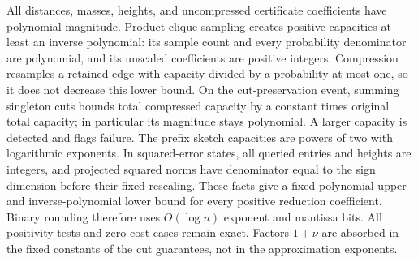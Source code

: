 \documentclass[11pt]{article}
\theoremstyle{definition}
\begin{document}
All distances, masses, heights, and uncompressed certificate coefficients
have polynomial magnitude. Product-clique sampling creates positive
capacities at least an inverse polynomial: its sample count and every
probability denominator are polynomial, and its unscaled coefficients
are positive integers. Compression resamples a retained edge with
capacity divided by a probability at most one, so it does not decrease
this lower bound. On the cut-preservation event, summing singleton cuts
bounds total compressed capacity by a constant times original total
capacity; in particular its magnitude stays polynomial. A larger
capacity is detected and flags failure. The prefix sketch capacities
are powers of two with logarithmic exponents. In squared-error states,
all queried entries and heights are integers, and projected squared norms
have denominator equal to the sign dimension before their fixed rescaling.
These facts give a fixed polynomial upper and inverse-polynomial lower
bound for every positive reduction coefficient. Binary rounding therefore
uses $O(\log n)$ exponent and mantissa bits. All positivity tests and
zero-cost cases remain exact. Factors $1+\nu$ are absorbed in the fixed
constants of the cut guarantees, not in the approximation exponents.
\end{document}
